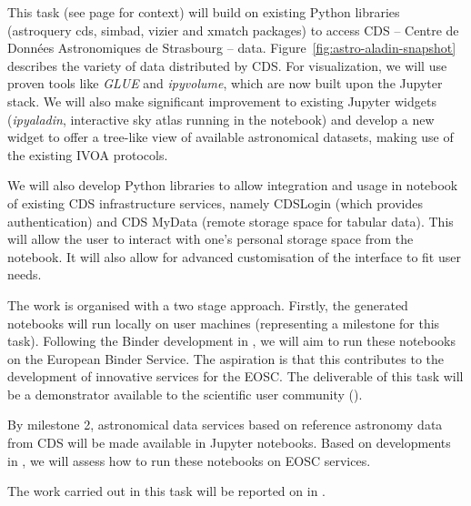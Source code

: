 \begin{task}[
  title=Demonstrator: Astronomy,
  id=astro,
  lead=CDS,
  PM=18,
  wphases={18-42},
  partners={EGI,INSERM,QS,SRL,WTT,XFEL}
]

  This task (see page \pageref{sec:concept-demonstrator-astronomy} for
  context) will build on existing Python libraries (astroquery cds, simbad, 
  vizier and xmatch packages) to access CDS -- Centre de Donn\'ees 
  Astronomiques de Strasbourg -- data. Figure~\ref{fig:astro-aladin-snapshot}
  describes the variety of data distributed by CDS.
  For visualization, we will
  use proven tools like \textit{GLUE} and \textit{ipyvolume}, which are now
  built upon the Jupyter stack.
  We will also make significant improvement to existing Jupyter widgets
  (\textit{ipyaladin}, interactive sky atlas running in the notebook) and
  develop a new widget to offer a tree-like view of available
  astronomical datasets, making use of the existing IVOA \cite{ivoa} 
  protocols.

  We will also develop Python libraries to allow integration and usage in
  notebook of existing CDS infrastructure services, namely CDSLogin (which
  provides authentication) and CDS MyData (remote storage space for tabular
  data).
  This will allow the user to interact with one's personal storage space from
  the notebook. It will also allow for advanced customisation of the interface
  to fit user needs.

  The work is organised with a two stage approach. Firstly, the generated
  notebooks will run locally on user machines (representing a milestone for
  this task). Following the Binder development in , we will aim
  to run these notebooks on the European Binder Service. The aspiration is
  that this contributes to the development of innovative services for the EOSC.
  The deliverable of this task will be a demonstrator available to the
  scientific user community ().

  By milestone 2, astronomical data services based on reference
  astronomy data from CDS will be made available in Jupyter notebooks.
  Based on developments in , we will assess how to run these
  notebooks on \TheProject EOSC services.

  The work carried out in this task will be reported on in
  .
\end{task}
